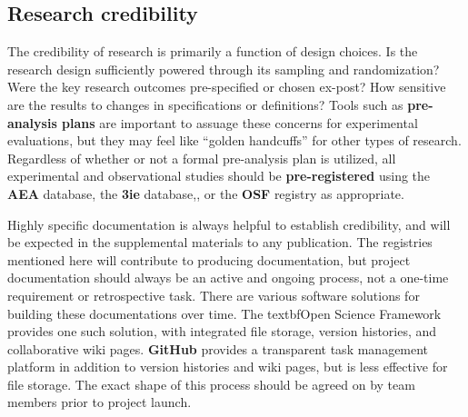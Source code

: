 \subsection{Research credibility}

The credibility of research is primarily a function of design choices.\cite{ioannidis2005most}
Is the research design sufficiently powered through its sampling and randomization?
Were the key research outcomes pre-specified or chosen ex-post?
How sensitive are the results to changes in specifications or definitions?
Tools such as \textbf{pre-analysis plans}
are important to assuage these concerns for experimental evaluations,
but they may feel like ``golden handcuffs'' for other types of research.\cite{olken2015promises}
Regardless of whether or not a formal pre-analysis plan is utilized,
all experimental and observational studies should be \textbf{pre-registered}
using the \textbf{AEA} database,
the \textbf{3ie} database,,
or the \textbf{OSF} registry as appropriate.

Highly specific documentation is always helpful to establish credibility,
and will be expected in the supplemental materials to any publication.
The registries mentioned here will contribute to producing documentation,
but project documentation should always be an active and ongoing process,
not a one-time requirement or retrospective task.
There are various software solutions for building these documentations over time.
The textbf{Open Science Framework} provides one such solution,
with integrated file storage, version histories, and collaborative wiki pages.
\textbf{GitHub} provides a transparent task management
platform
in addition to version histories and wiki pages, but is less effective for file storage.
The exact shape of this process should be agreed on by team members prior to project launch.

